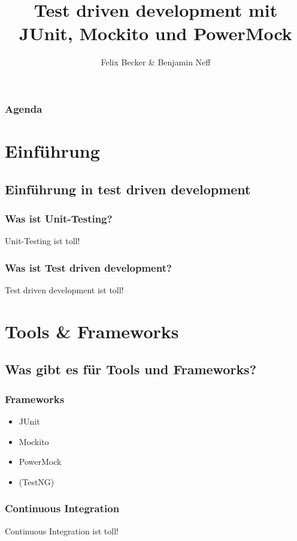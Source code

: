 \documentclass{beamer}
\title{Test driven development mit JUnit, Mockito und PowerMock}
\institute{Computerseminar Tondorf 2011}
\author[F. Becker, B. Neff]{
        Felix Becker \& 
	Benjamin Neff
}
\begin{document}
	\begin{frame}
		\titlepage
	\end{frame}

	\begin{frame}
		\frametitle{Agenda}
		\setcounter{tocdepth}{1}
		\tableofcontents
	\end{frame}
	

	\section{Einführung}
	
		\subsection{Einführung in test driven development}

			\begin{frame}
				\frametitle{Was ist Unit-Testing?}
				Unit-Testing ist toll!
			\end{frame}

			\begin{frame}
				\frametitle{Was ist Test driven development?}
				Test driven development ist toll!
			\end{frame}

	
	\section{Tools \& Frameworks}

		\subsection{Was gibt es für Tools und Frameworks?}

			\begin{frame}
				\frametitle{Frameworks}
				\begin{itemize}
					\item{JUnit}
					\item{Mockito}
					\item{PowerMock}
					\item{(TestNG)}
				\end{itemize}
			\end{frame}

			\begin{frame}
				\frametitle{Continuous Integration}
				Continuous Integration ist toll!
			\end{frame}
\end{document}
